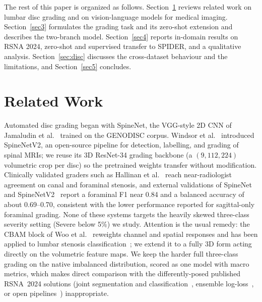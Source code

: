 \documentclass[runningheads]{llncs}
\begin{document}
The rest of this paper is organized as follows. Section~\ref{sec2} reviews related work on lumbar disc grading and on vision-language models for medical imaging. Section~\ref{sec3} formulates the grading task and its zero-shot extension and describes the two-branch model. Section~\ref{sec4} reports in-domain results on RSNA 2024, zero-shot and supervised transfer to SPIDER, and a qualitative analysis. Section~\ref{sec:disc} discusses the cross-dataset behaviour and the limitations, and Section~\ref{sec5} concludes.

\section{Related Work}\label{sec2}

Automated disc grading began with SpineNet, the VGG-style 2D CNN of Jamaludin et al.~\cite{jamaludin2017} trained on the GENODISC corpus. Windsor et al.~\cite{windsor2022} introduced SpineNetV2, an open-source pipeline for detection, labelling, and grading of spinal MRIs; we reuse its 3D ResNet-34 grading backbone (a $(9, 112, 224)$ volumetric crop per disc) so the pretrained weights transfer without modification. Clinically validated graders such as Hallinan et al.~\cite{hallinan2021} reach near-radiologist agreement on canal and foraminal stenosis, and external validations of SpineNet and SpineNetV2~\cite{mcsweeney2023,nigru2024} report a foraminal F1 near 0.84 and a balanced accuracy of about 0.69--0.70, consistent with the lower performance reported for sagittal-only foraminal grading. None of these systems targets the heavily skewed three-class severity setting (Severe below 5\%) we study. Attention is the usual remedy: the CBAM block of Woo et al.~\cite{woo2018cbam} reweights channel and spatial responses and has been applied to lumbar stenosis classification~\cite{lin2024cbam}; we extend it to a fully 3D form acting directly on the volumetric feature maps. We keep the harder full three-class grading on the native imbalanced distribution, scored as one model with macro metrics, which makes direct comparison with the differently-posed published RSNA~2024 solutions (joint segmentation and classification~\cite{aktan2025}, ensemble log-loss~\cite{kaggle2024}, or open pipelines~\cite{nshen2024}) inappropriate.
\end{document}
